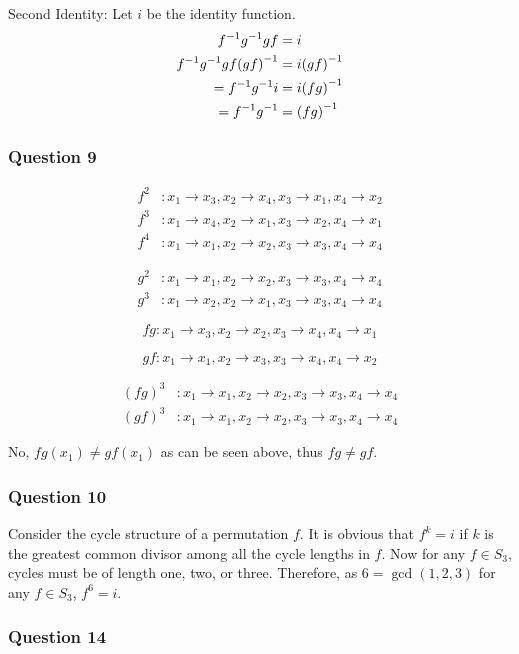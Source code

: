 \documentclass{article}
\begin{document}
 Second Identity: Let $i$ be the identity function.
\begin{align*}
{f}^{-1}{g}^{-1}gf &= i\\
{f}^{-1}{g}^{-1}gf{(gf)}^{-1} &= i{(gf)}^{-1}\\
={f}^{-1}{g}^{-1} i&=i{(fg)}^{-1}\\
={f}^{-1}{g}^{-1}&={(fg)}^{-1}
\end{align*}

\subsubsection{Question 9}

\begin{align*}
f^2&:x_1\to x_3, x_2 \to x_4, x_3 \to x_1, x_4 \to x_2\\
f^3&:x_1\to x_4, x_2 \to x_1, x_3 \to x_2, x_4 \to x_1\\
f^4&:x_1\to x_1, x_2 \to x_2, x_3 \to x_3, x_4 \to x_4
\end{align*}

\begin{align*}
g^2&:x_1\to x_1, x_2 \to x_2, x_3 \to x_3, x_4 \to x_4\\
g^3&:x_1\to x_2, x_2 \to x_1, x_3 \to x_3, x_4 \to x_4
\end{align*}

$$fg:x_1\to x_3, x_2\to x_2, x_3\to x_4, x_4\to x_1$$

$$gf:x_1\to x_1, x_2 \to x_3, x_3 \to x_4, x_4 \to x_2$$

\begin{align*}
(fg)^3&:x_1\to x_1, x_2 \to x_2, x_3 \to x_3, x_4 \to x_4\\
(gf)^3&:x_1\to x_1, x_2 \to x_2, x_3 \to x_3, x_4 \to x_4
\end{align*}

 No, $fg(x_1) \not= gf(x_1)$ as can be seen above, thus $fg\not=gf$.

\subsubsection{Question 10}
Consider the cycle structure of a permutation $f$. It is obvious that $f^k = i$ if $k$ is the greatest common divisor among all the cycle lengths in $f$. Now for any $f\in S_3$, cycles must be of length one, two, or three. Therefore, as $6 = \gcd(1,2,3)$ for any $f\in S_3$, $f^6=i$.

\subsubsection{Question 14}
\end{document}
